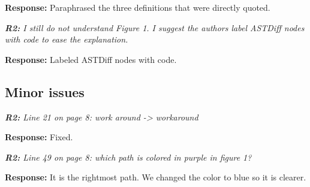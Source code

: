 \documentclass{article}
\begin{document}
\vspace*{1em} \noindent \textbf{Response:} Paraphrased the three definitions that were directly quoted.

\vspace*{1em} \noindent \textit{\textbf{R2: } I still do not understand Figure 1. I suggest the authors label ASTDiff nodes with code to ease the explanation.}

\vspace*{1em} \noindent \textbf{Response:} Labeled ASTDiff nodes with code. 

\subsection{Minor issues}

\textit{\textbf{R2:} Line 21 on page 8: work around -> workaround}

\vspace*{1em} \noindent \textbf{Response:} Fixed.

\vspace*{1em} \noindent \textit{\textbf{R2:} Line 49 on page 8: which path is colored in purple in figure 1?}

\vspace*{1em} \noindent \textbf{Response:} It is the rightmost path. We changed the color to blue so it is clearer.

\small


\end{document}
